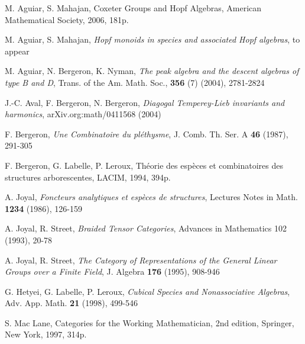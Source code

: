 \documentclass[11pt,reqno]{amsart}
\numberwithin{equation}{section}
\begin{document}
\begin{thebibliography}{\hphantom{99}}





   {\sc M. Aguiar, S. Mahajan}, Coxeter Groups and Hopf Algebras, American Mathematical Society, 2006, 181p.

   {\sc M. Aguiar, S. Mahajan}, {\em Hopf monoids in species and associated Hopf algebras}, to appear

   {\sc M. Aguiar, N. Bergeron, K. Nyman}, {\em The peak algebra and the descent algebras of type B and D}, Trans. of the Am. Math. Soc., {\bf 356} (7) (2004), 2781-2824

   {\sc J.-C. Aval, F. Bergeron, N. Bergeron}, {\em Diagogal Temperey-Lieb invariants and harmonics}, arXiv.org:math/0411568 (2004)


   {\sc F. Bergeron}, {\em Une Combinatoire du pl\'ethysme}, J. Comb. Th. Ser. A {\bf 46} (1987), 291-305

   {\sc F. Bergeron, G. Labelle, P. Leroux}, Th\'eorie des esp\`eces et combinatoires des structures arborescentes, LACIM, 1994, 394p.

   {\sc A. Joyal}, {\em Foncteurs analytiques et esp\`eces de structures}, Lectures Notes in Math. {\bf 1234} (1986), 126-159

   {\sc A. Joyal, R. Street}, {\em Braided Tensor Categories}, Advances in Mathematics 102 (1993), 20-78

   {\sc A. Joyal, R. Street}, {\em The Category of Representations of the General Linear Groups over a Finite Field}, J. Algebra {\bf 176} (1995), 908-946

   {\sc G. Hetyei, G. Labelle, P. Leroux}, {\em Cubical Species and Nonassociative Algebras}, Adv. App. Math. {\bf 21} (1998), 499-546

   {\sc S. Mac Lane}, Categories for the Working Mathematician, 2nd edition, Springer, New York, 1997, 314p.


\end{thebibliography}
\end{document}
